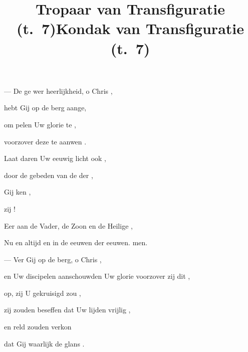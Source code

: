 
\title{Tropaar van Transfiguratie (t.~7)}
--- De ge wer heerlijkheid, o Chris ,\par
hebt Gij op de berg aange,\par
om  pelen Uw glorie te ,\par
voorzover deze te aanwen .\par
Laat   daren Uw eeuwig licht ook ,\par
door de gebeden van de der ,\par
Gij ken ,\par
\finalskip
{}\falltwice{~~~~} zij ! \fall{---}

\vskip 10pt
\fall{---} Eer aan de Vader, de Zoon en de Heilige ,\par
Nu en altijd en in de eeuwen der eeuwen. men. \fall{---} \par
\vskip 10pt

\title{Kondak van Transfiguratie (t.~7)}
--- Ver  Gij op de berg, o Chris ,\par
en Uw discipelen aanschouwden Uw glorie voorzover zij dit ,\par
op,  zij U gekruisigd zou ,\par
zij zouden beseffen dat Uw lijden vrijlig ,\par
en   reld zouden verkon\par
\finalskip
dat Gij waarlijk  de glans    . \fall{---}

\bye
